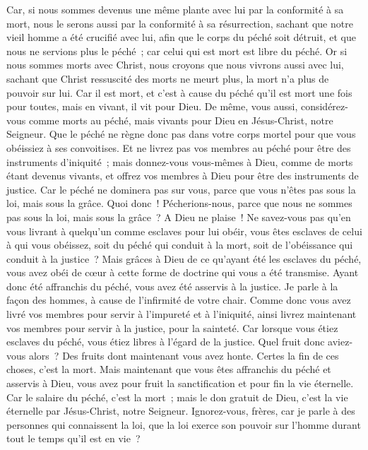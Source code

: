\begin{multicols}{2}
Car, si nous sommes devenus une même plante avec lui par la conformité à sa mort, nous le serons aussi par la conformité à sa résurrection,
sachant que notre vieil homme a été crucifié avec lui, afin que le corps du péché soit détruit, et que nous ne servions plus le péché~;
car celui qui est mort est libre du péché.
Or si nous sommes morts avec Christ, nous croyons que nous vivrons aussi avec lui,
sachant que Christ ressuscité des morts ne meurt plus, la mort n'a plus de pouvoir sur lui.
Car il est mort, et c'est à cause du péché qu'il est mort une fois pour toutes, mais en vivant, il vit pour Dieu.
De même, vous aussi, considérez-vous comme morts au péché, mais vivants pour Dieu en Jésus-Christ, notre Seigneur.
Que le péché ne règne donc pas dans votre corps mortel pour que vous obéissiez à ses convoitises.
Et ne livrez pas vos membres au péché pour être des instruments d'iniquité~; mais donnez-vous vous-mêmes à Dieu, comme de morts étant devenus vivants, et offrez vos membres à Dieu pour être des instruments de justice.
Car le péché ne dominera pas sur vous, parce que vous n'êtes pas sous la loi, mais sous la grâce.
Quoi donc~! Pécherions-nous, parce que nous ne sommes pas sous la loi, mais sous la grâce~? A Dieu ne plaise~!
Ne savez-vous pas qu'en vous livrant à quelqu'un comme esclaves pour lui obéir, vous êtes esclaves de celui à qui vous obéissez, soit du péché qui conduit à la mort, soit de l'obéissance qui conduit à la justice~?
Mais grâces à Dieu de ce qu'ayant été les esclaves du péché, vous avez obéi de cœur à cette forme de doctrine qui vous a été transmise.
Ayant donc été affranchis du péché, vous avez été asservis à la justice.
Je parle à la façon des hommes, à cause de l'infirmité de votre chair. Comme donc vous avez livré vos membres pour servir à l'impureté et à l'iniquité, ainsi livrez maintenant vos membres pour servir à la justice, pour la sainteté.
Car lorsque vous étiez esclaves du péché, vous étiez libres à l'égard de la justice.
Quel fruit donc aviez-vous alors~? Des fruits dont maintenant vous avez honte. Certes la fin de ces choses, c'est la mort.
Mais maintenant que vous êtes affranchis du péché et asservis à Dieu, vous avez pour fruit la sanctification et pour fin la vie éternelle.
Car le salaire du péché, c'est la mort~; mais le don gratuit de Dieu, c'est la vie éternelle par Jésus-Christ, notre Seigneur.
\VerseOne{}Ignorez-vous, frères, car je parle à des personnes qui connaissent la loi, que la loi exerce son pouvoir sur l'homme durant tout le temps qu'il est en vie~?

\end{multicols}
